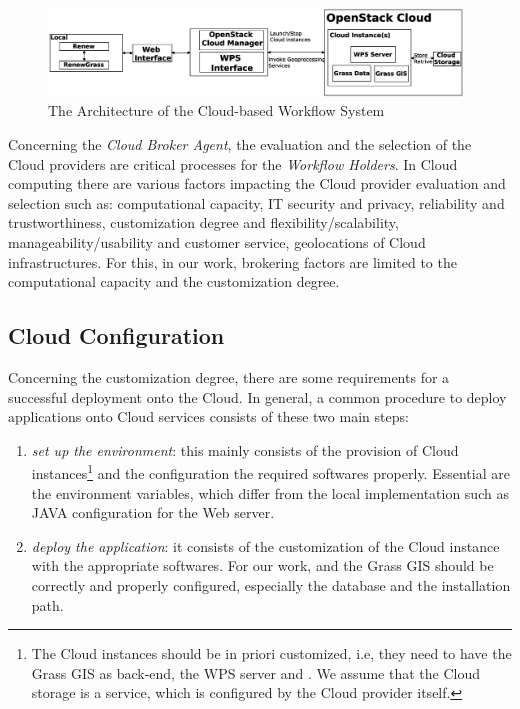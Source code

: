 \begin{figure}[!t]
    \centering
  \includegraphics[width=0.98\textwidth,height=0.20\textheight]{GrassMigration}
\caption{The Architecture of the Cloud-based Workflow System}
\label{fig:architecture}
\end{figure}



Concerning the \textit{Cloud Broker Agent}, the evaluation and the selection of the Cloud providers are critical processes for the \textit{Workflow Holders}.
%
In Cloud computing there are various factors impacting the Cloud provider evaluation and selection \cite{Haddad11,Badger+11a} such as: computational capacity, IT security and privacy, reliability and trustworthiness, customization degree and flexibility/scalability, manageability/usability and customer service, geolocations of Cloud infrastructures. 
%
For this, in our work, brokering factors are limited to the computational capacity and the customization degree. 

%
\subsection{Cloud Configuration}
%
Concerning the customization degree, there are some requirements for a successful deployment onto the Cloud.
%
In general, a common procedure to deploy applications onto Cloud services consists of these two main steps: 
%
\begin{enumerate}
 \item 
 \textit{set up the environment}: 
 this mainly consists of the provision of Cloud instances\footnote{The Cloud instances should be in priori customized, i.e, they need to have the Grass GIS as back-end, the WPS server and \Renew{}.
 We assume that the Cloud storage is a service, which is configured by the Cloud provider itself.
 } and the configuration the required softwares properly.
 Essential are the environment variables, which differ from the local implementation such as JAVA configuration for the Web server.
 \item
 \textit{deploy the application}: it consists of the customization of the Cloud instance with the appropriate softwares. 
 For our work, \Renew{} and the Grass GIS should be correctly and properly configured, especially the database and the installation path.
 
 \end{enumerate}
 

